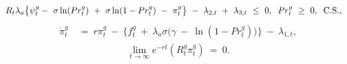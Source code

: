 \begin{equation}
\begin{split}
    & R_{t} \lambda_{a} \big\{ \psi_{t}^{g} - \ \sigma \ln(Pr_{t}^{g}) \ + \ \sigma \ln(1 - Pr_{t}^{g}) \ - \ \pi_{t}^{g} \big\} \ - \ \lambda_{2,t} \ + \ \lambda_{3,t} \ \leq \ 0, \hspace{0.2cm} Pr_{t}^{g} \ \geq \ 0,  \hspace{0.2cm} \text{C.S.},
\end{split}
\label{Equation:Firms-Problem_Necessary-Conditions_Drilling-Probability}
\end{equation}
\begin{equation}
\begin{split}
    \dot{\pi}_{t}^{g} \ 
    & = \ r \pi_{t}^{g} \ - \ \big\{ f_{t}^{g} \ + \ \lambda_{a} \sigma \big( \gamma \ - \ \ln(1 - Pr_{t}^{g}) \big) \big\} \ - \ \lambda_{1,t},
\end{split}
\label{Equation:Firms-Problem_Necessary-Conditions_Costate-Variable}
\end{equation}
\begin{equation}
\begin{split}
    \lim_{t \rightarrow \infty} e^{-rt} (R_{t}^{g} \pi_{t}^{g}) \ = \ 0.
\end{split}
\label{Equation:Social-Planners-Problem_Transversality-Condition}
\end{equation}